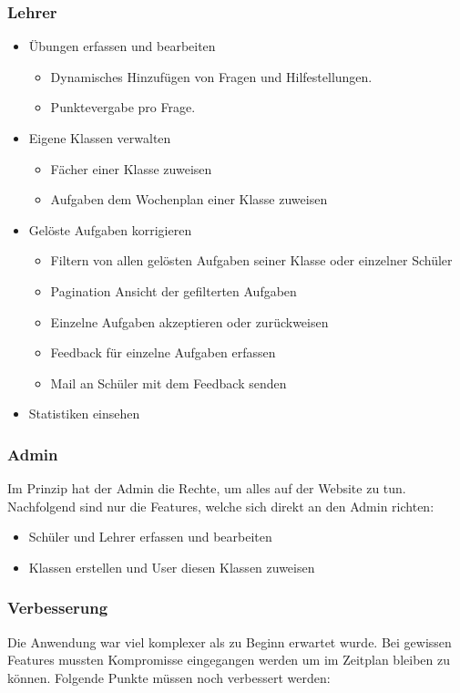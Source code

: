 \subsubsection*{Lehrer}
\begin{itemize}
	\item Übungen erfassen und bearbeiten
	\begin{itemize}
		\item Dynamisches Hinzufügen von Fragen und Hilfestellungen.
		\item Punktevergabe pro Frage.
	\end{itemize}
	\item Eigene Klassen verwalten
	\begin{itemize}
		\item Fächer einer Klasse zuweisen
		\item Aufgaben dem Wochenplan einer Klasse zuweisen
	\end{itemize}
	\item Gelöste Aufgaben korrigieren
	\begin{itemize}
		\item Filtern von allen gelösten Aufgaben seiner Klasse oder einzelner Schüler
		\item Pagination Ansicht der gefilterten Aufgaben
		\item Einzelne Aufgaben akzeptieren oder zurückweisen
		\item Feedback für einzelne Aufgaben erfassen
		\item Mail an Schüler mit dem Feedback senden
	\end{itemize}
	\item Statistiken einsehen
\end{itemize}


\subsubsection*{Admin}
Im Prinzip hat der Admin die Rechte, um alles auf der Website zu tun. Nachfolgend sind nur die Features, welche sich direkt an den Admin richten:

\begin{itemize}
	\item Schüler und Lehrer erfassen und bearbeiten
	\item Klassen erstellen und User diesen Klassen zuweisen
\end{itemize}


\subsubsection{Verbesserung}
\label{verbesserung}
Die Anwendung war viel komplexer als zu Beginn erwartet wurde. Bei gewissen Features mussten Kompromisse eingegangen werden um im Zeitplan bleiben zu können. Folgende Punkte müssen noch verbessert werden:


